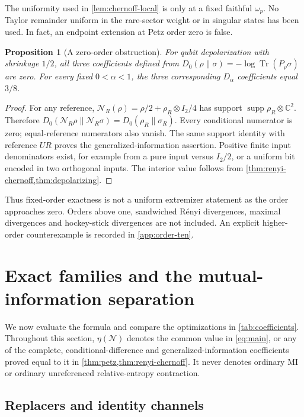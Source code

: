 \documentclass[11pt]{article}
\numberwithin{equation}{section}
\newtheorem{proposition}[theorem]{Proposition}
\theoremstyle{definition}
\theoremstyle{remark}
\DeclareMathOperator{\Tr}{Tr}
\DeclareMathOperator{\supp}{supp}
\newcommand{\N}{\mathcal N}
\begin{document}
The uniformity used in \cref{lem:chernoff-local} is only at a fixed
faithful $\omega_p$. No Taylor remainder uniform in the rare-sector weight
or in singular states has been used.
In fact, an endpoint extension at Petz order zero is false.

\begin{proposition}[A zero-order obstruction]
\label{prop:zero-order}
For qubit depolarization with shrinkage $1/2$, all three coefficients
defined from
$D_0(\rho\|\sigma)=-\log\Tr(P_\rho\sigma)$ are zero.
For every fixed $0<\alpha<1$, the three corresponding $D_\alpha$
coefficients equal $3/8$.
\end{proposition}
\begin{proof}
For any reference,
$\N_R(\rho)=\rho/2+\rho_R\otimes I_2/4$ has support
$\supp\rho_R\otimes\mathbb C^2$. Therefore
$D_0(\N_R\rho\|\N_R\sigma)=D_0(\rho_R\|\sigma_R)$.
Every conditional numerator is zero; equal-reference numerators also
vanish. The same support identity with reference $UR$ proves the
generalized-information assertion. Positive finite input denominators
exist, for example from a pure input versus $I_2/2$, or a uniform bit
encoded in two orthogonal inputs. The interior value follows from
\cref{thm:renyi-chernoff,thm:depolarizing}.
\end{proof}

Thus fixed-order exactness is not a uniform extremizer statement as the order
approaches zero. Orders above one, sandwiched R\'enyi divergences, maximal
divergences and hockey-stick divergences are not included. An explicit
higher-order counterexample is recorded in \cref{app:order-ten}.

\section{Exact families and the mutual-information separation}
\label{sec:examples}

We now evaluate the formula and compare the optimizations in
\cref{tab:coefficients}. Throughout this section, $\eta(\N)$ denotes the
common value in \eqref{eq:main}, or any of the complete, conditional-difference
and generalized-information coefficients proved equal to it in
\cref{thm:petz,thm:renyi-chernoff}. It never denotes ordinary MI or
ordinary unreferenced relative-entropy contraction.

\subsection{Replacers and identity channels}
\end{document}

